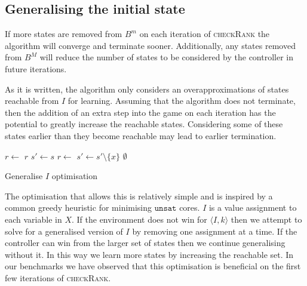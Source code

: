 \documentclass{llncs}
\begin{document}
\subsection{Generalising the initial state}

If more states are removed from $B^m$ on each iteration of \textsc{checkRank}
the algorithm will converge and terminate sooner. Additionally, any states
removed from $B^M$ will reduce the number of states to be considered by the
controller in future iterations.

As it is written, the algorithm only considers an overapproximations of states
reachable from $I$ for learning. Assuming that the algorithm does not
terminate, then the addition of an extra step into the game on each iteration
has the potential to greatly increase the reachable states. Considering some of
these states earlier than they become reachable may lead to earlier
termination.


\begin{algorithm}
    \begin{algorithmic}
            \State $r \gets $ 
             \Return $r$ \EndIIf
            \State $s' \gets s$
                \State $r \gets$ 
                 $s' \gets s' \setminus \{x\}$ \EndIIf
            \EndFor
            \State \Return $\emptyset$
        \EndFunction
    \end{algorithmic}
    \caption{Generalise $I$ optimisation}
    \label{alg:opt1}
\end{algorithm}

The optimisation that allows this is relatively simple and is inspired by a
common greedy heuristic for minimising $\texttt{unsat}$ cores. $I$ is a value
assignment to each variable in $X$. If the environment does not win for
$\langle I, k \rangle$ then we attempt to solve for a generalised version of
$I$ by removing one assignment at a time. If the controller can win from the
larger set of states then we continue generalising without it. In this way we
learn more states by increasing the reachable set. In our benchmarks we have
observed that this optimisation is beneficial on the first few iterations of
\textsc{checkRank}.

\end{document}
